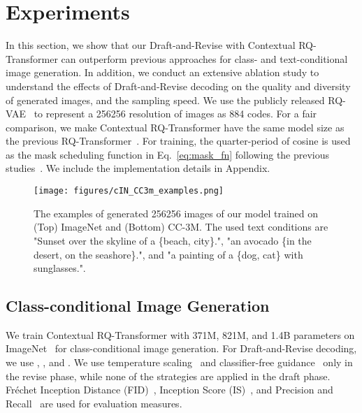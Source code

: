 \documentclass{article}
\newcommand{\ARmodel}{Contextual RQ-Transformer }
\begin{document}
\section{Experiments} \label{sec:experiments}
In this section, we show that our Draft-and-Revise with \ARmodel can outperform previous approaches for class- and text-conditional image generation.
In addition, we conduct an extensive ablation study to understand the effects of Draft-and-Revise decoding on the quality and diversity of generated images, and the sampling speed.
We use the publicly released RQ-VAE~\cite{RQVAE} to represent a 256256 resolution of images as 884 codes.
For a fair comparison, we make \ARmodel have the same model size as the previous RQ-Transformer~\cite{RQVAE}.
For training, the quarter-period of cosine is used as the mask scheduling function  in Eq.~\ref{eq:mask_fn} following the previous studies~\cite{MaskGIT,improvedDDPM}.
We include the implementation details in Appendix.

\begin{figure}
\centering
\texttt{[image: figures/cIN\_CC3m\_examples.png]}
\caption{The examples of generated 256256 images of our model trained on (Top) ImageNet and (Bottom) CC-3M. The used text conditions are "Sunset over the skyline of a \{beach, city\}.", "an avocado \{in the desert, on the seashore\}.", and "a painting of a \{dog, cat\} with sunglasses.".}
\label{fig:generated_images}
\end{figure}

\subsection{Class-conditional Image Generation} \label{sec:exp_class}

We train \ARmodel with 371M, 821M, and 1.4B parameters on ImageNet~\cite{deng2009imagenet} for class-conditional image generation.
For Draft-and-Revise decoding, we use , , and .
We use temperature scaling~\cite{hinton2015distilling} and classifier-free guidance~\cite{ho2021classifierfree} only in the revise phase, while none of the strategies are applied in the draft phase.
Fréchet Inception Distance (FID)~\cite{heusel2017gans}, Inception Score (IS)~\cite{inception-score}, and Precision and Recall~\cite{precision-recall} are used for evaluation measures.
\end{document}
